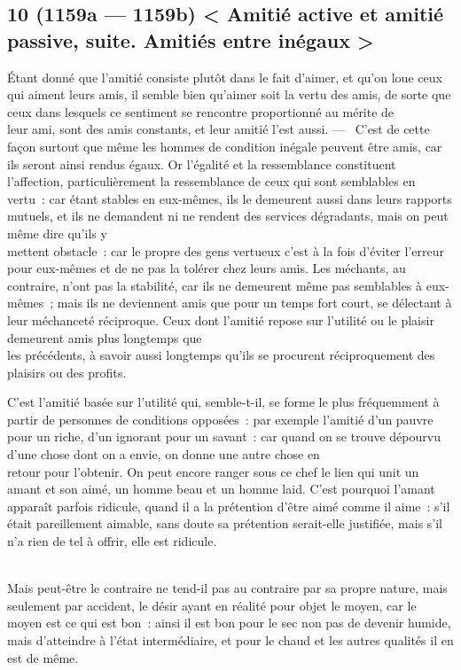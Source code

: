 \documentclass[french,twoside]{book} %
\begin{document}
\subsection[{10 (1159a — 1159b) < Amitié active et amitié passive, suite. Amitiés entre inégaux >}]{10 (1159a — 1159b) < Amitié active et amitié passive, suite. Amitiés entre inégaux >}
\noindent Étant donné que l’amitié consiste plutôt dans le fait d’aimer, et qu’on loue ceux qui aiment leurs amis, il semble bien qu’aimer soit la vertu des amis, de sorte que ceux dans lesquels ce sentiment se rencontre proportionné au mérite de \\
leur ami, sont des amis constants, et leur amitié l’est aussi. —  C’est de cette façon surtout que même les hommes de condition inégale peuvent être amis, car ils seront ainsi rendus égaux. Or l’égalité et la ressemblance constituent l’affection, particulièrement la ressemblance de ceux qui sont semblables en vertu : car étant stables en eux-mêmes, ils le demeurent aussi dans leurs rapports mutuels, et ils ne demandent ni ne rendent des services dégradants, mais on peut même dire qu’ils y \\
mettent obstacle : car le propre des gens vertueux c’est à la fois d’éviter l’erreur pour eux-mêmes et de ne pas la tolérer chez leurs amis. Les méchants, au contraire, n’ont pas la stabilité, car ils ne demeurent même pas semblables à eux-mêmes ; mais ils ne deviennent amis que pour un temps fort court, se délectant à leur méchanceté réciproque. Ceux dont l’amitié repose sur l’utilité ou le plaisir demeurent amis plus longtemps que \\
les précédents, à savoir aussi longtemps qu’ils se procurent réciproquement des plaisirs ou des profits.\par
C’est l’amitié basée sur l’utilité qui, semble-t-il, se forme le plus fréquemment à partir de personnes de conditions opposées : par exemple l’amitié d’un pauvre pour un riche, d’un ignorant pour un savant : car quand on se trouve dépourvu d’une chose dont on a envie, on donne une autre chose en \\
retour pour l’obtenir. On peut encore ranger sous ce chef le lien qui unit un amant et son aimé, un homme beau et un homme laid. C’est pourquoi l’amant apparaît parfois ridicule, quand il a la prétention d’être aimé comme il aime : s’il était pareillement aimable, sans doute sa prétention serait-elle justifiée, mais s’il n’a rien de tel à offrir, elle est ridicule.\par
\\
Mais peut-être le contraire ne tend-il pas au contraire par sa propre nature, mais seulement par accident, le désir ayant en réalité pour objet le moyen, car le moyen est ce qui est bon : ainsi il est bon pour le sec non pas de devenir humide, mais d’atteindre à l’état intermédiaire, et pour le chaud et les autres qualités il en est de même.
\end{document}
